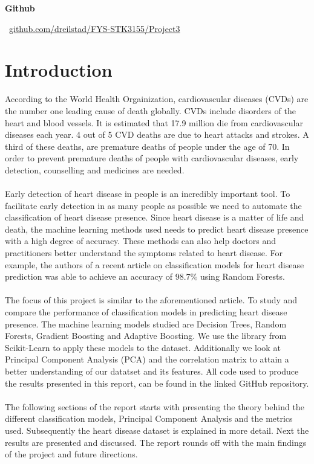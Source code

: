 \documentclass[a4paper,twocolumn]{article}
\begin{document}
\raggedbottom
\begin{center}
    \small \textbf{Github}
    
    \vspace{0.2cm}
    
    \faGithub \ \small \href{https://github.com/dreilstad/FYS-STK3155/tree/master/Project3}{github.com/dreilstad/FYS-STK3155/Project3}
\end{center}
\vspace{0.5cm}
\section{Introduction}
According to the World Health Orgainization\cite{who}, cardiovascular diseases (CVDs) are the number one leading cause of death globally. CVDs include disorders of the heart and blood vessels. It is estimated that 17.9 million die from cardiovascular diseases each year. 4 out of 5 CVD deaths are due to heart attacks and strokes. A third of these deaths, are premature deaths of people under the age of 70. In order to prevent premature deaths of people with cardiovascular diseases, early detection, counselling and medicines are needed.\\
\\
Early detection of heart disease in people is an incredibly important tool. To facilitate early detection in as many people as possible we need to automate the classification of heart disease presence. Since heart disease is a matter of life and death, the machine learning methods used needs to predict heart disease presence with a high degree of accuracy. These methods can also help doctors and practitioners better understand the symptoms related to heart disease. For example, the authors of a recent article\cite{introarticle} on classification models for heart disease prediction was able to achieve an accuracy of $98.7\%$ using Random Forests.\\
\\
The focus of this project is similar to the aforementioned article. To study and compare the performance of classification models in predicting heart disease presence. The machine learning models studied are Decision Trees, Random Forests, Gradient Boosting and Adaptive Boosting. We use the library from Scikit-Learn\cite{scikit} to apply these models to the dataset. Additionally we look at Principal Component Analysis (PCA) and the correlation matrix to attain a better understanding of our datatset and its features. All code used to produce the results presented in this report, can be found in the linked GitHub repository.\\
\\
The following sections of the report starts with presenting the theory behind the different classification models, Principal Component Analysis and the metrics used. Subsequently the heart disease dataset is explained in more detail. Next the results are presented and discussed. The report rounds off with the main findings of the project and future directions.
\end{document}
